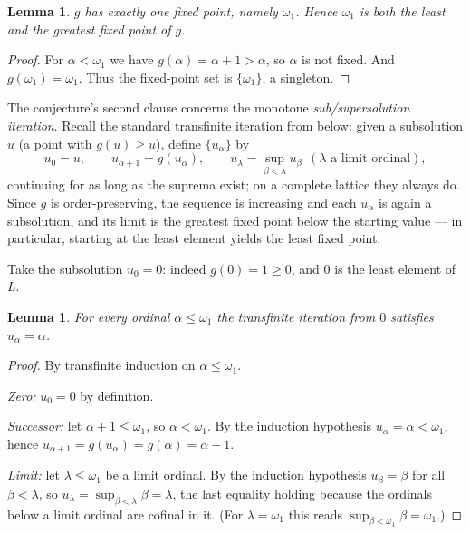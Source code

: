 \documentclass[11pt]{article}
\newtheorem{lemma}[theorem]{Lemma}
\theoremstyle{definition}
\theoremstyle{remark}
\newcommand{\Lc}{L}
\begin{document}
\begin{lemma}\label{lem:gfix}
$g$ has exactly one fixed point, namely $\omega_1$. Hence $\omega_1$ is both
the least and the greatest fixed point of $g$.
\end{lemma}

\begin{proof}
For $\alpha<\omega_1$ we have $g(\alpha)=\alpha+1>\alpha$, so $\alpha$ is not
fixed. And $g(\omega_1)=\omega_1$. Thus the fixed-point set is
$\{\omega_1\}$, a singleton.
\end{proof}

The conjecture's second clause concerns the monotone \emph{sub/supersolution
iteration}. Recall the standard transfinite iteration from below: given a
subsolution $u$ (a point with $g(u)\ge u$), define $\{u_\alpha\}$ by
\[
u_0=u,\qquad u_{\alpha+1}=g(u_\alpha),\qquad
u_\lambda=\sup_{\beta<\lambda} u_\beta \ \ (\lambda \text{ a limit ordinal}),
\]
continuing for as long as the suprema exist; on a complete lattice they always
do. Since $g$ is order-preserving, the sequence is increasing and each $u_\alpha$
is again a subsolution, and its limit is the greatest fixed point below the
starting value --- in particular, starting at the least element yields the least
fixed point.

Take the subsolution $u_0=0$: indeed $g(0)=1\ge 0$, and $0$ is the least
element of $\Lc$.

\begin{lemma}\label{lem:iterate}
For every ordinal $\alpha\le\omega_1$ the transfinite iteration from $0$
satisfies $u_\alpha=\alpha$.
\end{lemma}

\begin{proof}
By transfinite induction on $\alpha\le\omega_1$.

\emph{Zero:} $u_0=0$ by definition.

\emph{Successor:} let $\alpha+1\le\omega_1$, so $\alpha<\omega_1$. By the
induction hypothesis $u_\alpha=\alpha<\omega_1$, hence
$u_{\alpha+1}=g(u_\alpha)=g(\alpha)=\alpha+1$.

\emph{Limit:} let $\lambda\le\omega_1$ be a limit ordinal. By the induction
hypothesis $u_\beta=\beta$ for all $\beta<\lambda$, so
$u_\lambda=\sup_{\beta<\lambda}\beta=\lambda$, the last equality holding
because the ordinals below a limit ordinal are cofinal in it. (For
$\lambda=\omega_1$ this reads $\sup_{\beta<\omega_1}\beta=\omega_1$.)
\end{proof}
\end{document}
